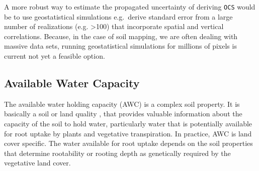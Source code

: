 \documentclass[graybox,natbib,nospthms,UStrade]{svmono}
\newenvironment{Shaded}{\begin{snugshade}}{\end{snugshade}}
\newcommand{\CommentTok}[1]{\textcolor[rgb]{0.37,0.37,0.37}{\textit{#1}}}
\newcommand{\DecValTok}[1]{\textcolor[rgb]{0.06,0.06,0.06}{#1}}
\newcommand{\FloatTok}[1]{\textcolor[rgb]{0.06,0.06,0.06}{#1}}
\newcommand{\KeywordTok}[1]{\textcolor[rgb]{0.27,0.27,0.27}{\textbf{#1}}}
\newcommand{\NormalTok}[1]{#1}
\newcommand{\OperatorTok}[1]{\textcolor[rgb]{0.43,0.43,0.43}{\textbf{#1}}}
\newcommand{\StringTok}[1]{\textcolor[rgb]{0.5,0.5,0.5}{#1}}
\begin{document}
\begin{Shaded}
\end{Shaded}

A more robust way to estimate the propagated uncertainty of deriving
\texttt{OCS} would be to use geostatistical simulations e.g.~derive standard
error from a large number of realizations (e.g. \textgreater{}100) that incorporate
spatial and vertical correlations. Because, in the case of soil mapping,
we are often dealing with massive data sets, running geostatistical
simulations for millions of pixels is current not yet a feasible option.

\hypertarget{available-water-capacity}{%
\subsection{Available Water Capacity}\label{available-water-capacity}}

The available water holding capacity (AWC) is a complex soil property.
It is basically a soil or land quality \citep{food1977framework}, that
provides valuable information about the capacity of the soil to hold
water, particularly water that is potentially available for root uptake
by plants and vegetative transpiration. In practice, AWC is land cover specific.
The water available for root uptake depends on the soil properties that
determine rootability or rooting depth as genetically required by the
vegetative land cover.
\end{document}
